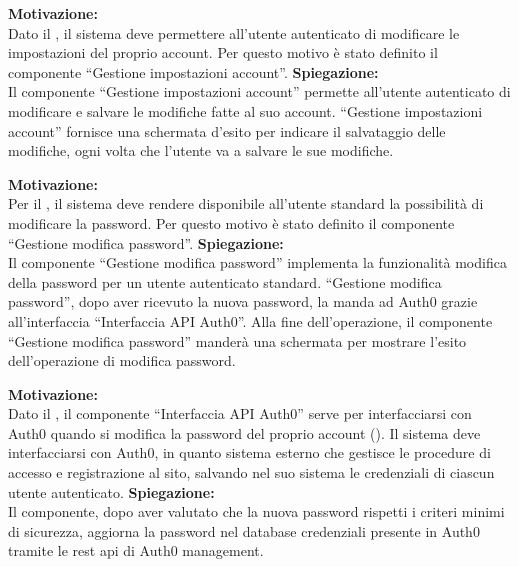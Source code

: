 \begin{listaPersonale}[ACI]{}

    \textbf{Motivazione:}\\
    Dato il , il sistema deve permettere all'utente autenticato di modificare le impostazioni del proprio account. Per questo motivo è stato definito il componente “Gestione impostazioni account”.
    \textbf{Spiegazione:}\\
    Il componente “Gestione impostazioni account” permette all'utente autenticato di modificare e salvare le modifiche fatte al suo account.
    “Gestione impostazioni account” fornisce una schermata d'esito per indicare il salvataggio delle modifiche, ogni volta che l'utente va a salvare le sue modifiche.



    \textbf{Motivazione:}\\
    Per il , il sistema deve rendere disponibile all'utente standard la possibilità di modificare la password. Per questo motivo è stato definito il componente “Gestione modifica password”.
    \textbf{Spiegazione:}\\
    Il componente “Gestione modifica password” implementa la funzionalità modifica della password per un utente autenticato standard. “Gestione modifica password”, dopo aver ricevuto la nuova password, la manda ad Auth0 grazie all'interfaccia “Interfaccia API Auth0”. Alla fine dell'operazione, il componente “Gestione modifica password” manderà una schermata per mostrare l'esito dell'operazione di modifica password.



    \textbf{Motivazione:}\\
    Dato il , il componente “Interfaccia API Auth0” serve per interfacciarsi con Auth0 quando si modifica la password del proprio account (). Il sistema deve interfacciarsi con Auth0, in quanto sistema esterno che gestisce le procedure di accesso e registrazione al sito, salvando nel suo sistema le credenziali di ciascun utente autenticato.
    \textbf{Spiegazione:}\\
    Il componente, dopo aver valutato che la nuova password rispetti i criteri minimi di sicurezza, aggiorna la password nel database credenziali presente in Auth0 tramite le rest api di Auth0 management.



\end{listaPersonale}
